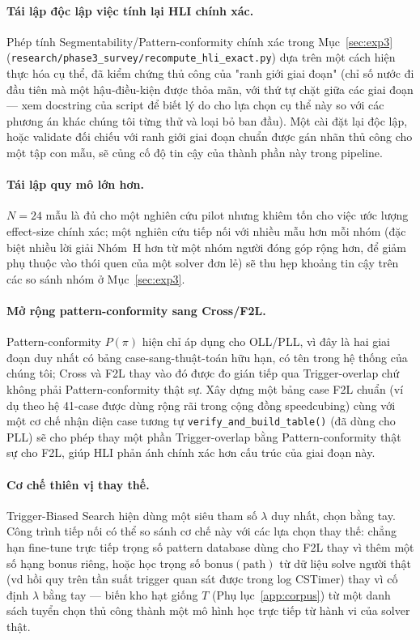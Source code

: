 \documentclass[10pt,conference]{article}
\begin{document}
\paragraph{Tái lập độc lập việc tính lại HLI chính xác.}
Phép tính Segmentability/Pattern-conformity chính xác trong
Mục~\ref{sec:exp3}
(\texttt{research/phase3\_survey/recompute\_hli\_exact.py}) dựa trên
một cách hiện thực hóa cụ thể, đã kiểm chứng thủ công của "ranh giới
giai đoạn" (chỉ số nước đi đầu tiên mà một hậu-điều-kiện được thỏa mãn,
với thứ tự chặt giữa các giai đoạn — xem docstring của script để biết
lý do cho lựa chọn cụ thể này so với các phương án khác chúng tôi từng
thử và loại bỏ ban đầu). Một cài đặt lại độc lập, hoặc validate đối
chiếu với ranh giới giai đoạn chuẩn được gán nhãn thủ công cho một tập
con mẫu, sẽ củng cố độ tin cậy của thành phần này trong pipeline.

\paragraph{Tái lập quy mô lớn hơn.} $N=24$ mẫu là đủ cho một nghiên cứu
pilot nhưng khiêm tốn cho việc ước lượng effect-size chính xác; một
nghiên cứu tiếp nối với nhiều mẫu hơn mỗi nhóm (đặc biệt nhiều lời giải
Nhóm~H hơn từ một nhóm người đóng góp rộng hơn, để giảm phụ thuộc vào
thói quen của một solver đơn lẻ) sẽ thu hẹp khoảng tin cậy trên các so
sánh nhóm ở Mục~\ref{sec:exp3}.

\paragraph{Mở rộng pattern-conformity sang Cross/F2L.}
Pattern-conformity $P(\pi)$ hiện chỉ áp dụng cho OLL/PLL, vì đây là
hai giai đoạn duy nhất có bảng case-sang-thuật-toán hữu hạn, có tên
trong hệ thống của chúng tôi; Cross và F2L thay vào đó được đo gián
tiếp qua Trigger-overlap chứ không phải Pattern-conformity thật sự.
Xây dựng một bảng case F2L chuẩn (ví dụ theo hệ 41-case được dùng
rộng rãi trong cộng đồng speedcubing) cùng với một cơ chế nhận diện
case tương tự \texttt{verify\_and\_build\_table()} (đã dùng cho PLL)
sẽ cho phép thay một phần Trigger-overlap bằng Pattern-conformity
thật sự cho F2L, giúp HLI phản ánh chính xác hơn cấu trúc của giai
đoạn này.

\paragraph{Cơ chế thiên vị thay thế.}
Trigger-Biased Search hiện dùng một siêu tham số $\lambda$ duy nhất,
chọn bằng tay. Công trình tiếp nối có thể so sánh cơ chế này với các
lựa chọn thay thế: chẳng hạn fine-tune trực tiếp trọng số pattern
database dùng cho F2L thay vì thêm một số hạng bonus riêng, hoặc học
trọng số $\mathrm{bonus}(\mathrm{path})$ từ dữ liệu solve người thật
(vd hồi quy trên tần suất trigger quan sát được trong log CSTimer)
thay vì cố định $\lambda$ bằng tay --- biến kho hạt giống $T$
(Phụ lục~\ref{app:corpus}) từ một danh sách tuyển chọn thủ công thành
một mô hình học trực tiếp từ hành vi của solver thật.
\end{document}
